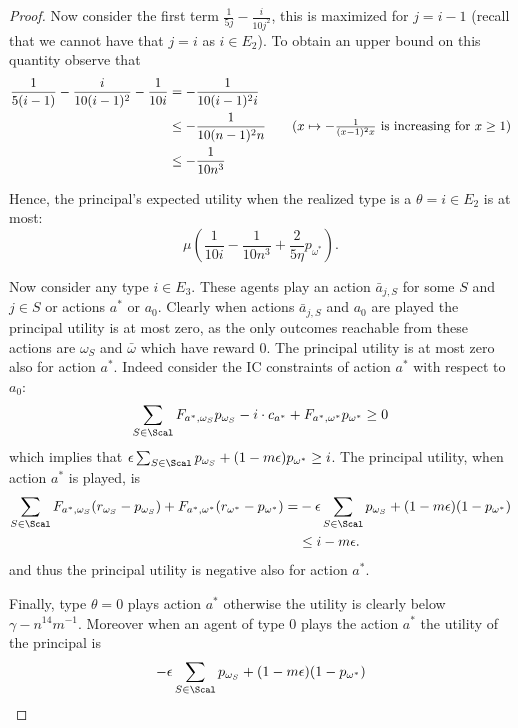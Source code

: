 \begin{proof}
	Now consider the first term $\frac{1}{5j}-\frac{i}{10j^2}$, this is maximized for $j=i-1$ (recall that we cannot have that $j=i$ as $i\in E_2$). To obtain an upper bound on this quantity observe that
	\begin{align}
		\frac{1}{5(i-1)}-\frac{i}{10(i-1)^2}-\frac{1}{10i}&=-\frac{1}{10(i-1)^2i}\\
		&\le -\frac{1}{10(n-1)^2n}\tag{$x\mapsto -\frac{1}{(x-1)^2x}$ is increasing for $x\ge 1$}\\
		&\le-\frac{1}{10n^3}
	\end{align}

	
	
	Hence, the principal's expected utility when the realized type is a $\theta=i \in E_2$ is at most:
	\[
		\mu\left(\frac{1}{10i}-\frac{1}{10n^3}+\frac{2}{5\eta}p_{\omega^*}\right).
	\]
	
	Now consider any type $i\in E_3$. These agents play an action $\bar a_{j, S}$ for some $S$ and $j\in S$ or actions $a^*$ or $a_0$.
	Clearly when actions $\bar a_{j, S}$ and $a_0$ are played the principal utility is at most zero, as the only outcomes reachable from these actions are $\omega_S$ and $\bar\omega$ which have reward $0$. The principal utility is at most zero also for action $a^*$. Indeed consider the IC constraints of action $a^*$ with respect to $a_0$:
	\[
	\sum_{S\in\Scal}F_{a^*,\omega_S}p_{\omega_S}-i\cdot c_{a^*} + F_{a^*,\omega^*} p_{\omega^*}\ge 0
	\]
	which implies that $\epsilon\sum_{S\in\Scal}p_{\omega_S}+(1-m\epsilon)p_{\omega^*}\ge i$. The principal utility, when action $a^*$ is played, is 
	\begin{align}
		\sum_{S\in\Scal} F_{a^*,\omega_S}(r_{\omega_S}-p_{\omega_S})+F_{a^*,\omega^*}(r_{\omega^*}-p_{\omega^*})=&-\epsilon\sum_{S\in\Scal}p_{\omega_S}+(1-m\epsilon)(1-p_{\omega^*})\\
		&\le i-m\epsilon.
	\end{align}
	and thus the principal utility is negative also for action $a^*$.
	
	
	
	 Finally, type $\theta=0$ plays action $a^*$ otherwise the utility is clearly below $\gamma-n^{14}m^{-1}$. Moreover when an agent of type $0$ plays the action $a^*$ the utility of the principal is 
	\[
	-\epsilon\sum_{S\in\Scal}p_{\omega_S}+(1-m\epsilon)(1-p_{\omega^*})
	\]
	

\end{proof}
